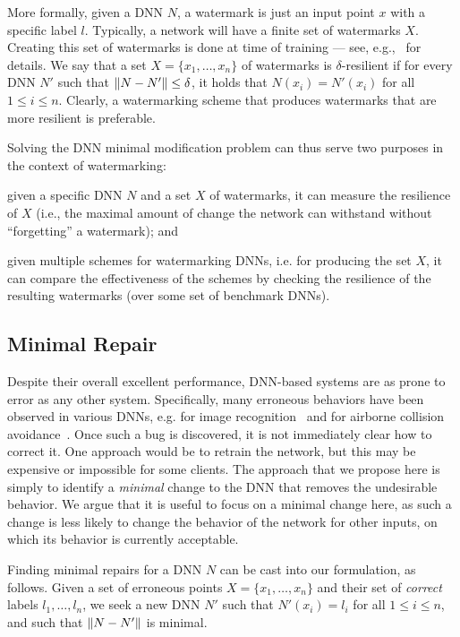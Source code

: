 \documentclass{easychair}
\begin{document}
More formally, given a DNN $N$, a watermark is just an input point $x$
with a specific label $l$. Typically, a network will have a finite set of
watermarks $X$. Creating this set of watermarks is done at time of
training --- see, e.g.,~\cite{AdBaPiKeWatermarking} for details. We
say that a set $X=\{x_1,\ldots,x_n\}$ of watermarks is $\delta$-resilient if for every
DNN $N'$ such that $\left\lVert N-N'\right\rVert\leq \delta$, it holds that
$N(x_i)=N'(x_i)$ for all $1\leq i \leq n$. Clearly, a watermarking
scheme that produces watermarks that are more resilient is preferable.

Solving the DNN minimal modification problem can thus serve two
purposes in the context of watermarking:
\begin{inparaenum}[(i)]
  \item given a specific DNN $N$ and a set $X$ of watermarks, it can
    measure the resilience of $X$ (i.e., the maximal amount of change
    the network can withstand without ``forgetting'' a  watermark);
    and
  \item given multiple schemes for watermarking DNNs, i.e. for
    producing the set $X$, it can compare the effectiveness of the
    schemes by checking the resilience of the resulting watermarks
    (over some set of benchmark DNNs).
\end{inparaenum}
  
\subsection{Minimal Repair}
Despite their overall excellent performance, DNN-based systems are as
prone to error as any other system. Specifically, many erroneous
behaviors have been observed in various DNNs, e.g. for image
recognition~\cite{EyEvFeLiRaXiPrKo18,SzZaSuBrErGoFe13} and for airborne collision
avoidance~\cite{JuLoBrOwKo16,KaBaDiJuKo17Reluplex}. Once such a bug is
discovered, it is not immediately clear how to correct it. One
approach would be to retrain the network, but this may be expensive
or impossible for some clients. The approach that we propose here is
simply to identify a \emph{minimal} change to the DNN that removes the
undesirable behavior. We argue that it is useful to focus on a minimal
change here, as such a change is less likely to change the behavior of
the network for other inputs, on which its behavior is currently acceptable.

Finding minimal repairs for a DNN $N$ can be cast into our
formulation, as follows. Given a set of erroneous points
$X=\{x_1,\ldots,x_n\}$ and their set of \emph{correct} labels
$l_1,\ldots,l_n$, we seek a new DNN $N'$ such that $N'(x_i)=l_i$ for
all $1\leq i \leq n$, and such that 
 $\left\lVert N-N'\right\rVert$ is minimal. 
\end{document}
